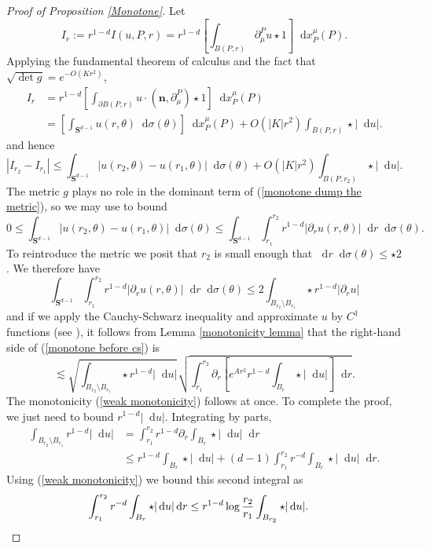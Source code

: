 \documentclass[reqno,10pt]{amsart}
\newcommand{\Sph}{\mathbf S}
\newcommand*\dif{\mathop{}\!\mathrm{d}}
\newcommand{\normal}{\mathbf n}
\theoremstyle{definition}
\numberwithin{equation}{section}
\begin{document}
\begin{proof}[Proof of Proposition \ref{Monotone}]
Let
$$I_r := r^{1 - d} I(u, P, r) = r^{1 - d} \left[\int_{B(P, r)} \partial_\mu^P u \star 1\right] \dif x^\mu_P(P).$$
Applying the fundamental theorem of calculus and the fact that $\sqrt{\det g} = e^{-O(Kr^2)}$,
\begin{align*}
I_r &= r^{1 - d} \left[\int_{\partial B(P, r)} u \cdot (\normal, \partial_\mu^P) \star 1\right] \dif x^\mu_P(P) \\
&= \left[\int_{\Sph^{d - 1}} u(r, \theta) \dif \sigma(\theta)\right] \dif x^\mu_P(P) + O(|K|r^2) \int_{B(P, r)} \star |\dif u|.
\end{align*}
and hence
\begin{equation}\label{monotone dump the metric}
|I_{r_2} - I_{r_1}| \leq \int_{\Sph^{d - 1}} |u(r_2, \theta) - u(r_1, \theta)| \dif \sigma(\theta) + O(|K|r^2) \int_{B(P, r_2)} \star |\dif u|.
\end{equation}
The metric $g$ plays no role in the dominant term of (\ref{monotone dump the metric}), so we may use \cite[Lemma 5.3]{Giusti77} to bound
$$0 \leq \int_{\Sph^{d - 1}} |u(r_2, \theta) - u(r_1, \theta)| \dif \sigma(\theta) \leq \int_{\Sph^{d - 1}} \int_{r_1}^{r_2} r^{1 - d}|\partial_r u(r, \theta)| \dif r \dif\sigma(\theta).$$
To reintroduce the metric we posit that $r_2$ is small enough that $\dif r \dif \sigma(\theta) \leq \star 2$.
We therefore have
\begin{equation}\label{monotone before cs}
\int_{\Sph^{d - 1}} \int_{r_1}^{r_2} r^{1 - d}|\partial_r u(r, \theta)| \dif r \dif\sigma(\theta) \leq 2 \int_{B_{r_2} \setminus B_{r_1}} \star r^{1 - d}|\partial_r u|
\end{equation}
and if we apply the Cauchy-Schwarz inequality and approximate $u$ by $C^1$ functions (see \cite[pg68]{Giusti77}), it follows from Lemma \ref{monotonicity lemma} that the right-hand side of (\ref{monotone before cs}) is
$$\lesssim \sqrt{\int_{B_{r_2} \setminus B_{r_1}} \star r^{1 - d} |\dif u|} \sqrt{\int_{r_1}^{r_2} \partial_r \left[e^{Ar^2} r^{1-d}\int_{B_r} \star |\dif u|\right] \dif r}.$$
The monotonicity (\ref{weak monotonicity}) follows at once.
To complete the proof, we just need to bound $r^{1 - d} |\dif u|$.
Integrating by parts,
\begin{align*}
\int_{B_{r_2} \setminus B_{r_1}} r^{1 - d} |\dif u| &= \int_{r_1}^{r_2} r^{1 - d} \partial_r \int_{B_r} \star |\dif u| \dif r \\
&\leq r^{1 - d} \int_{B_r} \star |\dif u| + (d - 1) \int_{r_1}^{r_2} r^{-d} \int_{B_r} \star |\dif u| \dif r.
\end{align*}
Using (\ref{weak monotonicity}) we bound this second integral as
\begin{align*}
\int_{r_1}^{r_2} r^{-d} \int_{B_r} \star |\dif u| \dif r &\leq r^{1 - d} \log \frac{r_2}{r_1} \int_{B_{r_2}} \star |\dif u|. \qedhere
\end{align*}
\end{proof}
\end{document}
